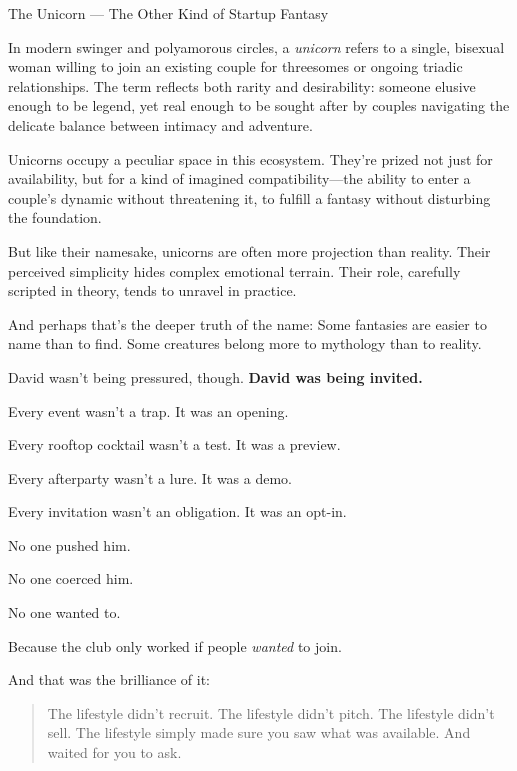 \begin{HistoricalSidebar}{The Unicorn --- The Other Kind of Startup Fantasy}

  In modern swinger and polyamorous circles, a \textit{unicorn} refers to a single, bisexual woman willing to join an existing 
  couple for threesomes or ongoing triadic relationships. The term reflects both rarity and desirability: someone elusive enough 
  to be legend, yet real enough to be sought after by couples navigating the delicate balance between intimacy and adventure.

  \medskip
  
  Unicorns occupy a peculiar space in this ecosystem. They’re prized not just for availability, but for a kind of imagined 
  compatibility—the ability to enter a couple’s dynamic without threatening it, to fulfill a fantasy without disturbing the 
  foundation.

  \medskip
  
  But like their namesake, unicorns are often more projection than reality. Their perceived simplicity hides complex emotional 
  terrain. Their role, carefully scripted in theory, tends to unravel in practice.

  \medskip
  
  And perhaps that’s the deeper truth of the name:  
  Some fantasies are easier to name than to find.  
  Some creatures belong more to mythology than to reality.
  
\end{HistoricalSidebar}

\medskip

David wasn't being pressured, though.  \textbf{David was being invited.}

Every event wasn’t a trap. It was an opening.

Every rooftop cocktail wasn’t a test. It was a preview.  

Every afterparty wasn’t a lure. It was a demo.  

Every invitation wasn’t an obligation. It was an opt-in.

No one pushed him. 

No one coerced him. 

No one wanted to. 

Because the club only worked if people \textit{wanted} to join.

And that was the brilliance of it:

\begin{quote}
The lifestyle didn’t recruit.  
The lifestyle didn’t pitch.  
The lifestyle didn’t sell.  
The lifestyle simply made sure you saw what was available.  
And waited for you to ask.
\end{quote}

